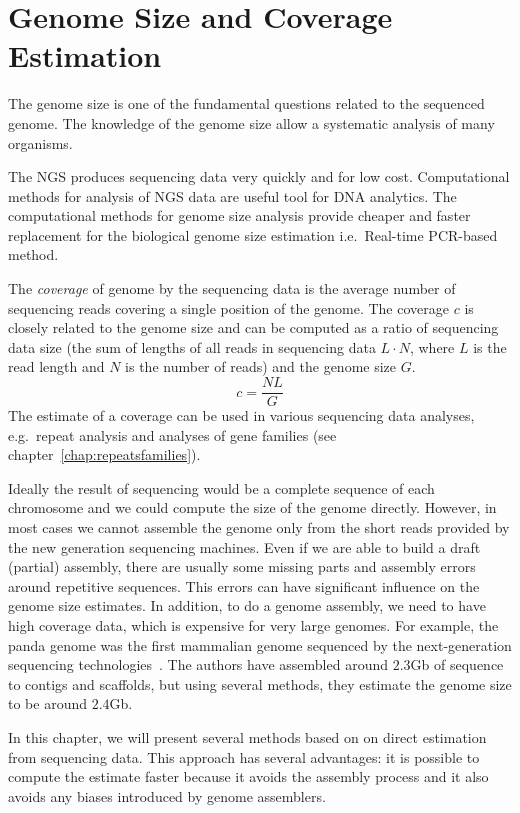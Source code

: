 \chapter[Genome Size and Coverage]{Genome Size and Coverage Estimation}
\label{chap:genomesize}

The genome size is one of the fundamental questions related to the sequenced genome. The knowledge of the genome size allow a systematic analysis of many organisms.

The NGS produces sequencing data very quickly and for low cost. Computational methods for analysis of NGS data are useful tool for DNA analytics. The computational methods for genome size analysis provide cheaper and faster replacement for the biological genome size estimation i.e.\ Real-time PCR-based method\cite{wilhelm2003real}.

The \emph{coverage} of genome by the sequencing data is the average number of sequencing reads covering a single position of the genome. The coverage $c$ is closely related to the genome size and can be computed as a ratio of sequencing data size (the sum of lengths of all reads in sequencing data $L\cdot N$, where $L$ is the read length and $N$ is the number of reads) and the genome size $G$.
$$c = \frac{NL}{G}$$
The estimate of a coverage can be used in various sequencing data analyses, e.g.\ repeat analysis and analyses of gene families (see chapter~\ref{chap:repeatsfamilies}). 

Ideally the result of sequencing would be a complete sequence of each chromosome and we could compute the size of the genome directly.
However, in most cases we cannot assemble the genome only from the short reads provided by the new generation sequencing machines.
Even if we are able to build a draft (partial) assembly, there are usually some missing parts and assembly errors around repetitive sequences. This errors can have significant influence on the genome size estimates. In addition, to do a genome assembly, we need to have high coverage data, which is expensive for very large genomes. For example, the panda genome was the first mammalian genome sequenced
by the next-generation sequencing technologies~\cite{li2010panda}. The authors have assembled around $2.3$Gb of sequence to contigs and scaffolds, but using
several methods, they estimate the genome size to be around $2.4$Gb.

In this chapter, we will present several methods based on on direct estimation from sequencing data. This approach has several advantages: it is possible to compute the estimate faster because it avoids the assembly process and it also avoids any biases introduced by genome assemblers.

